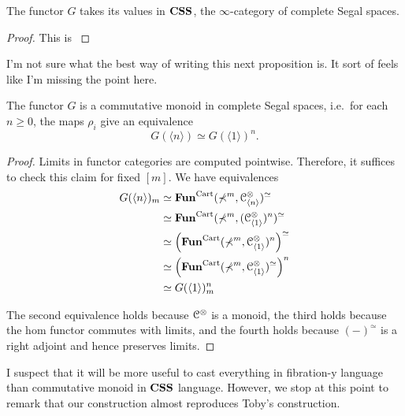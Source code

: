 \documentclass[main.tex]{subfiles}
\begin{document}
\begin{proposition}
  The functor $G$ takes its values in $\mathbf{CSS}$, the $\infty$-category of complete Segal spaces.
\end{proposition}
\begin{proof}
  This is \cite[Prop. 8.1]{1409.0837}
\end{proof}

\begin{note}
  I'm not sure what the best way of writing this next proposition is. It sort of feels like I'm missing the point here.
\end{note}

\begin{proposition}
  The functor $G$ is a commutative monoid in complete Segal spaces, i.e.\ for each $n \geq 0$, the maps $\rho_{i}$ give an equivalence
  \begin{equation*}
    G(\langle n \rangle) \simeq G(\langle 1 \rangle)^{n}.
  \end{equation*}
\end{proposition}
\begin{proof}
  Limits in functor categories are computed pointwise. Therefore, it suffices to check this claim for fixed $[m]$.
  We have equivalences
  \begin{align*}
    G(\langle n \rangle)_{m} &\simeq \mathbf{Fun}^{\mathrm{Cart}}(\mathbb{\Sigma}^{m}, \mathcal{C}^{\otimes}_{\langle n \rangle})^{\simeq} \\
    &\simeq \mathbf{Fun}^{\mathrm{Cart}}(\mathbb{\Sigma}^{m}, (\mathcal{C}^{\otimes}_{\langle 1 \rangle})^{n})^{\simeq} \\
    &\simeq \left(\mathbf{Fun}^{\mathrm{Cart}}(\mathbb{\Sigma}^{m}, \mathcal{C}^{\otimes}_{\langle 1 \rangle})^{n}\right)^{\simeq} \\
    &\simeq \left(\mathbf{Fun}^{\mathrm{Cart}}(\mathbb{\Sigma}^{m}, \mathcal{C}^{\otimes}_{\langle 1 \rangle})^{\simeq}\right)^{n} \\
    &\simeq G(\langle 1 \rangle)_{m}^{n}
  \end{align*}

  The second equivalence holds because $\mathcal{C}^{\otimes}$ is a monoid, the third holds because the hom functor commutes with limits, and the fourth holds because $(-)^{\simeq}$ is a right adjoint and hence preserves limits.
\end{proof}

I suspect that it will be more useful to cast everything in fibration-y language than commutative monoid in $\mathbf{CSS}$ language. However, we stop at this point to remark that our construction almost reproduces Toby's construction.
\end{document}
